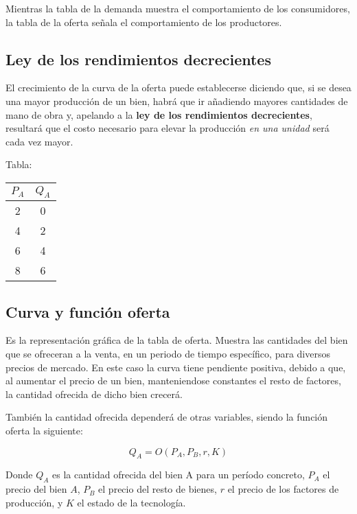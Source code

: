 Mientras la tabla de la demanda muestra el comportamiento de los consumidores,
la tabla de la oferta señala el comportamiento de los productores.

\subsection{Ley de los rendimientos decrecientes}

El crecimiento de la curva de la oferta puede establecerse diciendo que,
si se desea una mayor producción de un bien,
habrá que ir añadiendo mayores cantidades de mano de obra y,
apelando a la \textbf{ley de los rendimientos decrecientes},
resultará que el costo necesario para elevar la producción \textit{en una unidad} será cada vez mayor.

Tabla:
\begin{table}[H]
    \centering
    \begin{tabular}{c c} 
        \hline
        \( P_A\) & \(Q_A\) \\
        \hline
        2        & 0       \\
        4        & 2       \\
        6        & 4       \\
        8        & 6       \\
        \hline
    \end{tabular}
\end{table}

\subsection{Curva y función oferta}

Es la representación gráfica de la tabla de oferta.
Muestra las cantidades del bien que se ofreceran a la venta,
en un periodo de tiempo específico,
para diversos precios de mercado.
En este caso la curva tiene pendiente positiva,
debido a que,
al aumentar el precio de un bien,
manteniendose constantes el resto de factores,
la cantidad ofrecida de dicho bien crecerá.

También la cantidad ofrecida dependerá de otras variables,
siendo la función oferta la siguiente:

\begin{equation*}
    Q_A = O(P_A, P_B, r, K)
\end{equation*}

Donde \(Q_A\) es la cantidad ofrecida del bien A para un período concreto,
\(P_A\) el precio del bien \(A\),
\(P_B\) el precio del resto de bienes,
\(r\) el precio de los factores de producción,
y \(K\) el estado de la tecnología.


